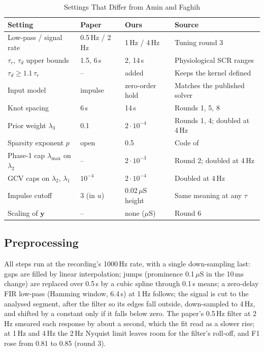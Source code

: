 \documentclass[conference]{IEEEtran}
\newcommand{\uS}{\,$\mu$S}
\begin{document}
\begin{table}[t]
\centering
\caption{Settings That Differ from Amin and Faghih \cite{amin2021}}
\label{tab:changes}
\footnotesize
\setlength{\tabcolsep}{3pt}
\begin{tabular}{@{}lllp{2.3cm}@{}}
\toprule
Setting & Paper & Ours & Source \\
\midrule
Low-pass / signal rate & 0.5\,Hz / 2\,Hz & 1\,Hz / 4\,Hz & Tuning round 3 \\
$\tau_r$, $\tau_d$ upper bounds & 1.5, 6\,s & 2, 14\,s & Physiological SCR ranges \\
$\tau_d \ge 1.1\,\tau_r$ & -- & added & Keeps the kernel defined \\
Input model & impulse & zero-order hold & Matches the published solver \\
Knot spacing & 6\,s & 14\,s & Rounds 1, 5, 8 \\
Prior weight $\lambda_3$ & 0.1 & $2\cdot10^{-4}$ & Rounds 1, 4; doubled at 4\,Hz \\
Sparsity exponent $p$ & open & 0.5 & Code of \cite{faghih2014} \\
Phase-1 cap $\lambda_{\max}$ on $\lambda_2$ & -- & $2\cdot10^{-3}$ & Round 2; doubled at 4\,Hz \\
GCV caps on $\lambda_2$, $\lambda_1$ & $10^{-4}$ & $2\cdot10^{-4}$ & Doubled at 4\,Hz \\
Impulse cutoff & 3 (in $u$) & 0.02\uS{} height & Same meaning at any $\tau$ \\
Scaling of $\mathbf{y}$ & -- & none ($\mu$S) & Round 6 \\
\bottomrule
\end{tabular}
\end{table}

\subsection{Preprocessing}\label{sec:prep}
All steps run at the recording's 1000\,Hz rate, with a single down-sampling last: gaps are filled
by linear interpolation; jumps (prominence 0.1\uS{} in the 10\,ms change) are replaced over
0.5\,s by a cubic spline through 0.1\,s means; a zero-delay FIR low-pass (Hamming window, 6.4\,s)
at 1\,Hz follows; the signal is cut to the analysed segment, after the filter so its edges fall
outside, down-sampled to 4\,Hz, and shifted by a constant only if it falls below zero. The
paper's 0.5\,Hz filter at 2\,Hz smeared each response by about a second, which the fit read as a
slower rise; at 1\,Hz and 4\,Hz the 2\,Hz Nyquist limit leaves room for the filter's roll-off, and
F1 rose from 0.81 to 0.85 (round 3).
\end{document}
